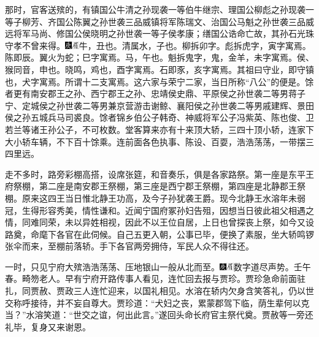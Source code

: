 那时，官客送殡的，有镇国公牛清之孙现袭一等伯牛继宗、理国公柳彪之孙现袭一等子柳芳、齐国公陈翼之孙世袭三品威镇将军陈瑞文、治国公马魁之孙世袭三品威远将军马尚、修国公侯晓明之孙世袭一等子侯孝康；缮国公诰命亡故，其孙石光珠守孝不曾来得。{\includegraphics[width=3mm]{../Images/00004}\includegraphics[width=3mm]{../Images/00010}\footnotesize \kaishu 牛，丑也。清属水，子也。柳拆卯字。彪拆虎字，寅字寓焉。陈即辰。翼火为蛇；巳字寓焉。马，午也。魁拆鬼字，鬼，金羊，未字寓焉。侯、猴同音，申也。晓鸣，鸡也，酉字寓焉。石即豕，亥字寓焉。其祖曰守业，即守镇也，犬字寓焉。所谓十二支寓焉。}这六家与荣宁二家，当日所称“八公”的便是。馀者更有南安郡王之孙、西宁郡王之孙、忠靖侯史鼎、平原侯之孙世袭二等男蒋子宁、定城侯之孙世袭二等男兼京营游击谢鲸、襄阳侯之孙世袭二等男戚建辉、景田侯之孙五城兵马司裘良。馀者锦乡伯公子韩奇、神威将军公子冯紫英、陈也俊、卫若兰等诸王孙公子，不可枚数。堂客算来亦有十来顶大轿，三四十顶小轿，连家下大小轿车辆，不下百十馀乘。连前面各色执事、陈设、百耍，浩浩荡荡，一带摆三四里远。

走不多时，路旁彩棚高搭，设席张筵，和音奏乐，俱是各家路祭。第一座是东平王府祭棚，第二座是南安郡王祭棚，第三座是西宁郡王祭棚，第四座是北静郡王祭棚。原来这四王当日惟北静王功高，及今子孙犹袭王爵。现今北静王水溶年未弱冠，生得形容秀美，情性谦和。近闻宁国府冢孙妇告殂，因想当日彼此祖父相遇之情，同难同荣，未以异姓相视，因此不以王位自居，上日也曾探丧上祭，如今又设路奠，命麾下各官在此伺候。自己五更入朝，公事已毕，便换了素服，坐大轿鸣锣张伞而来，至棚前落轿。手下各官两旁拥侍，军民人众不得往还。

一时，只见宁府大殡浩浩荡荡、压地银山一般从北而至。{\includegraphics[width=3mm]{../Images/00004}\includegraphics[width=3mm]{../Images/00010}\footnotesize \kaishu 数字道尽声势。壬午春。畸笏老人。}早有宁府开路传事人看见，连忙回去报与贾珍。贾珍急命前面驻扎，同贾赦、贾政三人连忙迎来，以国礼相见。水溶在轿内欠身含笑答礼，仍以世交称呼接待，并不妄自尊大。贾珍道：“犬妇之丧，累蒙郡驾下临，荫生辈何以克当？”水溶笑道：“世交之谊，何出此言。”遂回头命长府官主祭代奠。贾赦等一旁还礼毕，复身又来谢恩。

